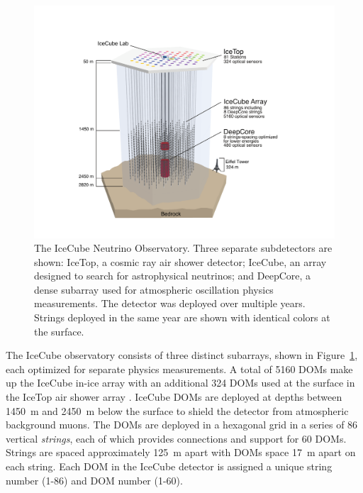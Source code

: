 \begin{figure}
\includegraphics[width=0.9\linewidth]{ArrayWSeasonsLabels.pdf}
\caption[An overview of the subdetectors in the IceCube Neutrino Observatory]{The IceCube Neutrino Observatory. Three separate subdetectors are shown: IceTop, a cosmic ray air shower detector; IceCube, an array designed to search for astrophysical neutrinos; and DeepCore, a dense subarray used for atmospheric oscillation physics measurements. The detector was deployed over multiple years. Strings deployed in the same year are shown with identical colors at the surface. }
\label{fig:icecube_depth}
\end{figure}

The IceCube observatory consists of three distinct subarrays, shown in Figure~\ref{fig:icecube_depth}, each optimized for separate physics measurements.
A total of 5160 DOMs make up the IceCube in-ice array with an additional 324 DOMs used at the surface in the IceTop air shower array \cite{Description-IceCube}.
IceCube DOMs are deployed at depths between 1450~m and 2450~m below the surface to shield the detector from atmospheric background muons.
The DOMs are deployed in a hexagonal grid in a series of 86 vertical \emph{strings}, each of which provides connections and support for 60 DOMs.
Strings are spaced approximately 125~m apart with DOMs space 17~m apart on each string.
Each DOM in the IceCube detector is assigned a unique string number (1-86) and DOM number (1-60).

